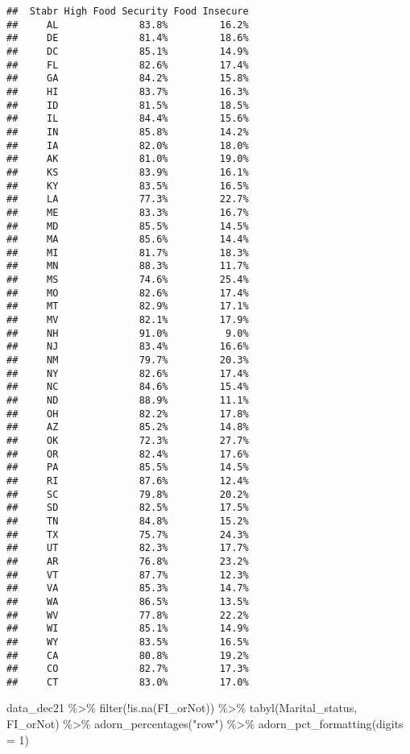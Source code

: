 \documentclass[
]{article}
\newenvironment{Shaded}{\begin{snugshade}}{\end{snugshade}}
\newcommand{\AttributeTok}[1]{\textcolor[rgb]{0.77,0.63,0.00}{#1}}
\newcommand{\DecValTok}[1]{\textcolor[rgb]{0.00,0.00,0.81}{#1}}
\newcommand{\FunctionTok}[1]{\textcolor[rgb]{0.00,0.00,0.00}{#1}}
\newcommand{\NormalTok}[1]{#1}
\newcommand{\SpecialCharTok}[1]{\textcolor[rgb]{0.00,0.00,0.00}{#1}}
\newcommand{\StringTok}[1]{\textcolor[rgb]{0.31,0.60,0.02}{#1}}
\begin{document}
\begin{verbatim}
##  Stabr High Food Security Food Insecure
##     AL              83.8%         16.2%
##     DE              81.4%         18.6%
##     DC              85.1%         14.9%
##     FL              82.6%         17.4%
##     GA              84.2%         15.8%
##     HI              83.7%         16.3%
##     ID              81.5%         18.5%
##     IL              84.4%         15.6%
##     IN              85.8%         14.2%
##     IA              82.0%         18.0%
##     AK              81.0%         19.0%
##     KS              83.9%         16.1%
##     KY              83.5%         16.5%
##     LA              77.3%         22.7%
##     ME              83.3%         16.7%
##     MD              85.5%         14.5%
##     MA              85.6%         14.4%
##     MI              81.7%         18.3%
##     MN              88.3%         11.7%
##     MS              74.6%         25.4%
##     MO              82.6%         17.4%
##     MT              82.9%         17.1%
##     MV              82.1%         17.9%
##     NH              91.0%          9.0%
##     NJ              83.4%         16.6%
##     NM              79.7%         20.3%
##     NY              82.6%         17.4%
##     NC              84.6%         15.4%
##     ND              88.9%         11.1%
##     OH              82.2%         17.8%
##     AZ              85.2%         14.8%
##     OK              72.3%         27.7%
##     OR              82.4%         17.6%
##     PA              85.5%         14.5%
##     RI              87.6%         12.4%
##     SC              79.8%         20.2%
##     SD              82.5%         17.5%
##     TN              84.8%         15.2%
##     TX              75.7%         24.3%
##     UT              82.3%         17.7%
##     AR              76.8%         23.2%
##     VT              87.7%         12.3%
##     VA              85.3%         14.7%
##     WA              86.5%         13.5%
##     WV              77.8%         22.2%
##     WI              85.1%         14.9%
##     WY              83.5%         16.5%
##     CA              80.8%         19.2%
##     CO              82.7%         17.3%
##     CT              83.0%         17.0%
\end{verbatim}

\begin{Shaded}
\begin{Highlighting}[]
\NormalTok{data\_dec21 }\SpecialCharTok{\%\textgreater{}\%} \FunctionTok{filter}\NormalTok{(}\SpecialCharTok{!}\FunctionTok{is.na}\NormalTok{(FI\_orNot)) }\SpecialCharTok{\%\textgreater{}\%} 
\FunctionTok{tabyl}\NormalTok{(Marital\_status, FI\_orNot) }\SpecialCharTok{\%\textgreater{}\%} 
  \FunctionTok{adorn\_percentages}\NormalTok{(}\StringTok{"row"}\NormalTok{) }\SpecialCharTok{\%\textgreater{}\%} 
  \FunctionTok{adorn\_pct\_formatting}\NormalTok{(}\AttributeTok{digits =} \DecValTok{1}\NormalTok{)}
\end{Highlighting}
\end{Shaded}
\end{document}
